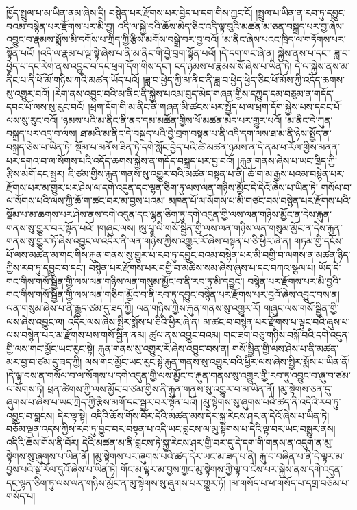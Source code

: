 ཁྱོད་སྤྲུལ་པ་མ་ཡིན་ནམ་ཞེས་དྲི། བསྙེན་པར་རྫོགས་པར་བྱེད་པ་དག་གིས་ཀྱང་ངོ། །སྤྲུལ་པ་ཡིན་ན་རབ་ཏུ་དབྱུང་བའམ་བསྙེན་པར་རྫོགས་པར་མི་བྱ། འདི་ལ་སྐྱེ་བའི་ཆོས་མེད་ཅིང་འདི་ལྟ་བུའི་མཚན་མ་ཅན་བསྐྲད་པར་བྱ་ཞེས་འབྱུང་བ་རྣམས་སྨོས་མི་དགོས་པ་ཀྲིད་ཀྱི་རྩིས་མགོས་བསྒྲེ་བར་བྱ་བའོ། །མ་ནིང་ཞེས་པའང་ཁྲིད་ལ་གཏོགས་པར་སྟོན་པའོ། །འདི་ལ་རྣམ་པ་ལྔ་སྟེ་ཞེས་པ་ནི་མ་ནིང་གི་བྱེ་བྲག་སྟོན་པའོ། །དེ་དག་གང་ཞེ་ན། སྐྱེས་ནས་པ་དང་། ཟླ་བ་ཕྱེད་པ་དང་རེག་ནས་འབྱུང་བ་དང་ཕྲག་དོག་གིས་དང་། ངད་ཉམས་པ་རྣམས་སོ་ཞེས་པ་ཡིན་ཏེ། དེ་ལ་སྐྱེས་ནས་མ་ནིང་པ་ནི་ཕོ་མོ་གཉིས་ཀའི་མཚན་ཡོད་པའོ། །ཟླ་བ་ཕྱེད་ཀྱི་མ་ནིང་ནི་ཟླ་བ་ཕྱེད་ཕྱེད་ཅིང་ཕོ་མོས་ཀྱི་འདོད་ཆགས་སུ་འགྱུར་བའོ། །རེག་ནས་འབྱུང་བའི་མ་ནིང་ནི་སྐྱེས་པའམ་བུད་མེད་གཞན་གྱིས་དཀྱུད་དམ་བཅུམ་ན་གདོད་དབང་པོ་ལས་སུ་རུང་བའོ། །ཕྲག་དོག་གི་མ་ནིང་ནི་གཞན་མི་ཚངས་པར་སྤྱོད་པ་ལ་ཕྲག་དོག་སྐྱེས་པས་དབང་པོ་ལས་སུ་རུང་བའོ། །ཉམས་པའི་མ་ནིང་ནི་ནད་དམ་མཚོན་གྱིས་ཕོ་མཚན་མེད་པར་གྱུར་པའོ། །མ་ནིང་དེ་ཀུན་བསྐྲད་པར་འདྲ་བ་ལས། ཐ་མའི་མ་ནིང་དེ་བསྐྲད་པའི་བྱེ་བྲག་བསྟན་པ་ནི་འདི་དག་ལས་ཐ་མ་ནི་ཉེས་སྤྱོད་ན་བསྐྲད་ཅེས་པ་ཡིན་ཏེ། སྡོམ་པ་མནོས་ཟིན་ཏེ་དགེ་སློང་བྱེད་པའི་ཚེ་མཚན་ཉམས་ན་དེ་ནམ་ཕ་རོལ་གྱིས་མནན་པར་དགའ་བ་ལ་སོགས་པའི་འདོད་ཆགས་སྐྱེས་ན་གདོད་བསྐྲད་པར་བྱ་བའོ། །རྐུན་གནས་ཞེས་པ་ཡང་ཁྲིད་ཀྱི་རྩིས་མགོ་དང་སྦྱར། ཇི་ཙམ་གྱིས་རྐུན་གནས་སུ་འགྱུར་བའི་མཚན་བསྟན་པ་ནི། ཆོ་ག་མ་རྒྱས་པའམ་བསྙེན་པར་རྫོགས་པར་མ་གྱུར་པར་ཤེས་ལ་དགེ་འདུན་དང་ལྷན་ཅིག་ཏུ་ལས་ལན་གཉིས་མྱོང་དེ་དེའོ་ཞེས་པ་ཡིན་ཏེ། གསོལ་བ་ལ་སོགས་པའི་ལས་ཀྱི་ཆོ་ག་ཚང་བར་མ་བྱས་པའམ། མཁན་པོ་ལ་སོགས་པ་མི་གཙང་བས་བསྙེན་པར་རྫོགས་པའི་སྡོམ་པ་མ་ཆགས་པར་ཤེས་ནས་དགེ་འདུན་དང་ལྷན་ཅིག་ཏུ་དགེ་འདུན་གྱི་ལས་ལན་གཉིས་མྱོང་ན་དེས་རྐུན་གནས་སུ་གྱུར་བར་སྟོན་པའོ། །གཞུང་ལས། ཨུ་པཱ་ལི་གསོ་སྦྱིན་གྱི་ལས་ལན་གཉིས་ལན་གསུམ་མྱོང་ན་དེས་རྐུན་གནས་སུ་གྱུར་ཏོ་ཞེས་འབྱུང་ལ་འདིར་ནི་ལན་གཉིས་ཀྱིས་འགྱུར་རོ་ཞེས་བསྟན་པ་ཅི་ཕྱིར་ཞེ་ན། གཏམ་གྱི་དངོས་པོ་ལས་མཚན་མ་གང་གིས་རྐུན་གནས་སུ་གྱུར་པ་རབ་ཏུ་དབྱུང་བའམ་བསྙེན་པར་མི་བགྱི་བ་ལགས་ན་མཚན་ཉིད་ཀྱིས་རབ་ཏུ་དབྱུང་བ་དང་། བསྙེན་པར་རྫོགས་པར་བགྱི་བ་མཆིས་སམ་ཞེས་ཞུས་པ་དང་བཀའ་སྩལ་པ། ཡོད་དེ་གང་གིས་གསོ་སྦྱིན་གྱི་ལས་ལན་གཉིས་ལན་གསུམ་མྱོང་བ་ནི་རབ་ཏུ་མི་དབྱུང་། བསྙེན་པར་རྫོགས་པར་མི་བྱའི་གང་གིས་གསོ་སྦྱིན་གྱི་ལས་ལན་གཅིག་མྱོང་བ་ནི་རབ་ཏུ་དབྱུང་བསྙེན་པར་རྫོགས་པར་བྱའོ་ཞེས་འབྱུང་བས་ན། ལན་གསུམ་ཞེས་པ་ནི་རྒྱུད་ཙམ་དུ་ཟད་ཀྱི། ལན་གཉིས་ཀྱིས་རྐུན་གནས་སུ་འགྱུར་རོ། གཞུང་ལས་གསོ་སྦྱིན་གྱི་ལས་ཞེས་འབྱུང་ལ། འདིར་ལས་ཞེས་སྤྱིར་སྨོས་པ་ཅིའི་ཕྱིར་ཞེ་ན། མ་ཚང་བ་བསྙེན་པར་རྫོགས་པ་ལྟུང་བའི་ཞུས་པ་ལས་བསྙེན་པར་མ་རྫོགས་པས་གསོ་སྦྱིན་ནམ། ཚུལ་ནས་འབྱུང་བའམ། གང་ཟག་བཅུ་གཉིས་བསྐོ་བའི་དགེ་འདུན་གྱི་ལས་གང་མྱོང་ཡང་རུང་སྟེ། རྐུན་གནས་སུ་འགྱུར་རོ་ཞེས་འབྱུང་བས་ན། གསོ་སྦྱིན་གྱི་ལས་ཤེས་པ་ནི་མཚན་མར་བྱ་བ་ཙམ་དུ་ཟད་ཀྱི། ལས་གང་མྱོང་ཡང་རུང་སྟེ་རྐུན་གནས་སུ་འགྱུར་བའི་ཕྱིར་ལས་ཞེས་སྤྱིར་སྨོས་པ་ཡིན་ནོ། །དེ་ལྟ་བས་ན་གསོལ་བ་ལ་སོགས་པ་དགེ་འདུན་གྱི་ལས་མྱོང་བ་རྐུན་གནས་སུ་འགྱུར་གྱི་རབ་ཏུ་འབྱུང་བ་ཞུ་བ་ཙམ་ལ་སོགས་ཏེ། ཕྲན་ཚེགས་ཀྱི་ལས་མྱོང་བ་ཙམ་གྱིས་ནི་རྐུན་གནས་སུ་འགྱུར་བ་མ་ཡིན་ནོ། །མུ་སྟེགས་ཅན་དུ་ཞུགས་པ་ཞེས་པ་ཡང་ཀྲིད་ཀྱི་རྩིས་མགོ་དང་སྦྱར་བར་སྟོན་པའོ། །མུ་སྟེགས་སུ་ཞུགས་པའི་ཚད་ནི་འདིའི་རབ་ཏུ་འབྱུང་བ་བླངས། དེར་ལྟ་སྟེ། འདིའི་ཆོས་གོས་བོར་དེའི་མཚན་མས་དེར་སྐྱ་རེངས་ཤར་ན་དེའོ་ཞེས་པ་ཡིན་ཏེ། བཅོམ་ལྡན་འདས་ཀྱིས་རབ་ཏུ་བྱུང་བར་བསྟན་པ་འདི་ཡང་བླངས་ལ་མུ་སྟེགས་པ་དེའི་ལྟ་བར་ཡང་བསྒྱུར་ནས། འདིའི་ཆོས་གོས་ནི་བོར། དེའི་མཚན་མ་ནི་བླངས་ཏེ་སྐྱ་རེངས་ཤར་གྱི་བར་དུ་དེ་དག་གི་གནས་ན་འདུག་ན་མུ་སྟེགས་སུ་ཞུགས་པ་ཡིན་ནོ། །མུ་སྟེགས་པར་ཞུགས་པའི་ཚད་དེར་ཡང་མ་ཟད་པ་ནི། རྐུ་བ་བཞིན་པ་ནི་དེ་ལྟར་མ་བྱས་པའི་སྔ་རོལ་དུའོ་ཞེས་པ་ཡིན་ཏེ། གོང་མ་ལྟར་མ་བྱས་ཀྱང་མུ་སྟེགས་ཀྱི་ལྟ་བ་ངེས་པར་སྐྱེས་ནས་དགེ་འདུན་དང་ལྷན་ཅིག་ཏུ་ལས་ལན་གཉིས་མྱོང་ན་མུ་སྟེགས་སུ་ཞུགས་པར་གྱུར་ཏོ། །མ་གསོད་པ་ཕ་གསོད་པ་དགྲ་བཅོམ་པ་གསོད་པ། 